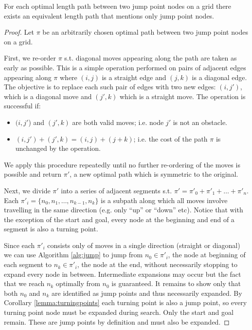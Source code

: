 \begin{theorem}
\label{theorem:jumping}
For each optimal length path between two jump point nodes on a grid there exists
an equivalent length path that mentions only jump point nodes.
\end{theorem}
\begin{proof}
Let $\pi$ be an arbitrarily chosen optimal path between two jump point nodes
on a grid.  
\par
First, we re-order $\pi$ s.t. diagonal moves appearing along the path are taken
as early as possible. This is a simple operation performed on pairs of adjacent
edges appearing along $\pi$ where $(i, j)$ is a straight edge and $(j, k)$ is a
diagonal edge.
The objective is to replace each such pair of edges with two new edges: 
$(i, j')$, which is a diagonal move and $(j', k)$ which is a straight move. 
The operation is successful if:
\begin{itemize}
\item $(i, j'$) and $(j', k)$ are both valid moves; i.e. node $j'$ is not an
obstacle.
\item $(i, j') + (j', k) = (i, j) + (j + k)$; i.e. the cost of
the path $\pi$ is unchanged by the operation.
\end{itemize}
We apply this procedure repeatedly until no further re-ordering of the moves
is possible and return $\pi'$, a new optimal path which is symmetric
to the original.
\par
Next, we divide $\pi'$ into a series of adjacent segments s.t. 
$\pi' = \pi'_{0} + \pi'_{1} + \ldots + \pi'_{n} $. Each $\pi'_{i} = \lbrace n_{0}, n_{1},
\ldots, n_{k-1}, n_{k} \rbrace$ is a subpath along which all moves involve
travelling in the same direction (e.g.  only ``up'' or ``down'' etc).  Notice
that with the exception of the start and goal, every node at the beginning and
end of a segment is also a turning point.
\par
Since each $\pi'_{i}$ consists only of moves in a single direction
(straight or diagonal) we can use Algorithm \ref{alg:jump} to jump from $n_{0}
\in \pi'_{i}$, the node at beginning of each segment to $n_{k} \in \pi'_{i}$, the
node at the end, without necessarily stopping to expand every node in between.
Intermediate expansions may occur but the fact that we reach $n_{k}$
optimally from $n_{0}$ is guaranteed.
It remains to show only that both $n_{0}$ and $n_{k}$ are identified as
jump points and thus necessarily expanded. 
By Corollary \ref{lemma:turningpoints} each turning point is 
also a jump point, so every turning point node must be expanded during search.
Only the start and goal remain. These are jump points by definition and must
also be expanded.
\end{proof}


